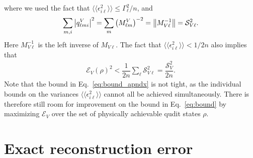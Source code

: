 \documentclass[nofootinbib,twocolumn]{revtex4-1}
\newcommand{\f}[2]{\dfrac{#1}{#2}} %
\newcommand{\p}[1]{\left(#1\right)} %
\newcommand{\bbk}[1]{\langle\!\langle #1 \rangle\!\rangle}
\newcommand{\E}{\mathcal{E}}
\renewcommand{\S}{\mathcal{S}}
\begin{document}
where we used the fact that $\bbk{\epsilon_{i\ell}^2}\le\Gamma_\ell^2/n$, and
\begin{align}
  \sum_{m,i} \abs{q^V_{\ell mi}}^2
  = \sum_m \p{M^V_{\ell m}}^{-2}
  = \norm{M_{V\ell}^{-1}}
  = \S_{V\ell}^2.
\end{align}
Here $M_{V\ell}^{-1}$ is the left inverse of $M_{V\ell}$.
The fact that $\bbk{\epsilon_{i\ell}^2}<1/2n$ also implies that
\begin{align}
  \E_V\p{\rho}^2 < \f1{2n} \sum_\ell \S_{V\ell}^2 = \f{\S_V^2}{2n}.
\end{align}
Note that the bound in Eq.~\eqref{eq:bound_apndx} is not tight, as the individual bounds on the variances $\bbk{\epsilon_{i\ell}^2}$ cannot all be achieved simultaneously.
There is therefore still room for improvement on the bound in Eq.~\eqref{eq:bound} by maximizing $\E_V$ over the set of physically achievable qudit states $\rho$.

\section{Exact reconstruction error}
\label{sec:exact}
\end{document}
